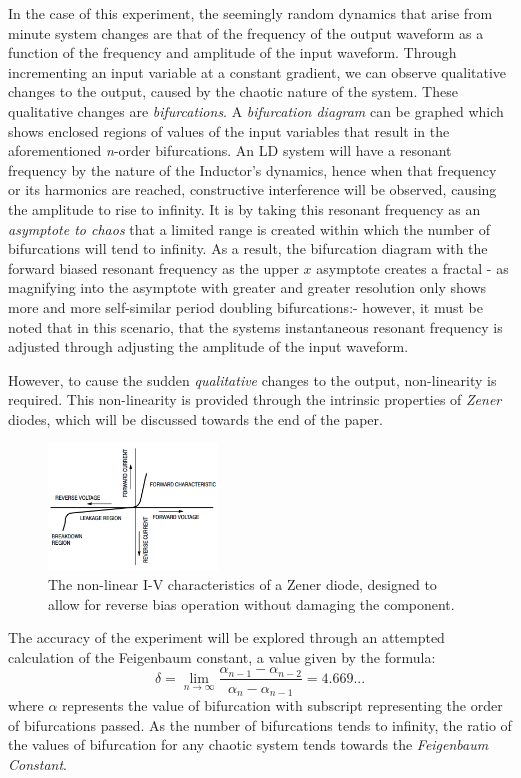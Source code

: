 \documentclass[10pt,twocolumn,letterpaper]{article}
\begin{document}
In the case of this experiment, the seemingly random dynamics that arise from minute system changes are that of the frequency of the output waveform as a function of the frequency and amplitude of the input waveform.  Through incrementing an input variable at a constant gradient, we can observe qualitative changes to the output, caused by the chaotic nature of the system.  These qualitative changes are \textit{bifurcations}.  A \textit{bifurcation diagram} can be graphed which shows enclosed regions of values of the input variables that result in the aforementioned \textit{n}-order bifurcations.  An LD system will have a resonant frequency by the nature of the Inductor's dynamics, hence when that frequency or its harmonics are reached, constructive interference will be observed, causing the amplitude to rise to infinity.  It is by taking this resonant frequency as an \textit{asymptote to chaos} that a limited range is created within which the number of bifurcations will tend to infinity.  As a result, the bifurcation diagram with the forward biased resonant frequency as the upper \(x\) asymptote creates a fractal - as magnifying into the asymptote with greater and greater resolution only shows more and more self-similar period doubling bifurcations:- however, it must be noted that in this scenario, that the systems instantaneous resonant frequency is adjusted through adjusting the amplitude of the input waveform\cite{diodefact}.

However, to cause the sudden \textit{qualitative} changes to the output, non-linearity is required\cite{werner1}.  This non-linearity is provided through the intrinsic properties of \textit{Zener} diodes, which will be discussed towards the end of the paper.

\begin{figure}[h]
  \centering
  \includegraphics[width=0.4\textwidth]{figures/zener2.png}
  \caption{The non-linear I-V characteristics of a Zener diode, designed to allow for reverse bias operation without damaging the component\cite{diode}.}
\end{figure}

The accuracy of the experiment will be explored through an attempted calculation of the Feigenbaum constant, a value given by the formula:
\[\delta = \lim_{n \to \infty }\frac{\alpha_{n-1} - \alpha_{n-2} }{\alpha_{n} - \alpha_{n-1}} = 4.669...\]
where \(\alpha\) represents the value of bifurcation with subscript representing the order of bifurcations passed\cite{feigenbaum}.  As the number of bifurcations tends to infinity, the ratio of the values of bifurcation for any chaotic system tends towards the \emph{Feigenbaum Constant}.
\end{document}
